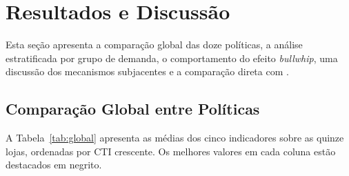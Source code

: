 \documentclass[a4paper,11pt]{article}
\begin{document}
\section{Resultados e Discussão}

Esta seção apresenta a comparação global das doze políticas, a
análise estratificada por grupo de demanda, o comportamento do
efeito \textit{bullwhip}, uma discussão dos mecanismos subjacentes
e a comparação direta com \citet{zabraoui:2025}.

\subsection{Comparação Global entre Políticas}

A Tabela~\ref{tab:global} apresenta as médias dos cinco indicadores
sobre as quinze lojas, ordenadas por CTI crescente. Os melhores
valores em cada coluna estão destacados em negrito.
\end{document}
